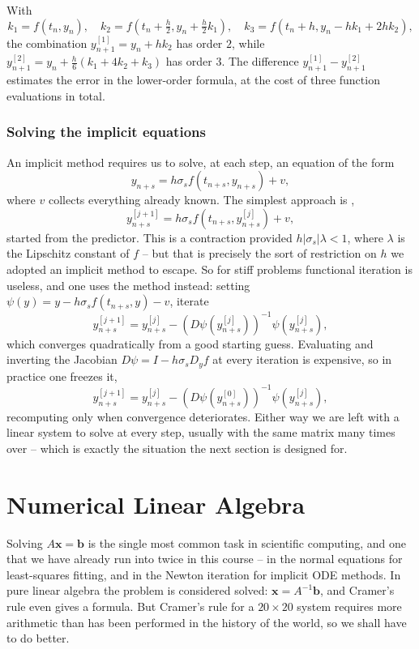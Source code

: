 \documentclass[a4paper]{scrartcl}
\providecommand{\abs}[1]{\left\lvert#1\right\rvert}
\renewcommand{\abs}[1]{\left\lvert#1\right\rvert}
\begin{document}
\begin{example}
  With
  $$
  k_1 = f(t_n,y_n), \quad k_2 = f\left(t_n + \tfrac{h}{2}, y_n + \tfrac{h}{2}k_1\right), \quad k_3 = f\left(t_n + h, y_n - hk_1 + 2hk_2\right),
  $$
  the combination $y^{[1]}_{n+1} = y_n + hk_2$ has order $2$, while $y^{[2]}_{n+1} = y_n + \tfrac{h}{6}(k_1 + 4k_2 + k_3)$ has order $3$. The difference $y^{[1]}_{n+1} - y^{[2]}_{n+1}$ estimates the error in the lower-order formula, at the cost of three function evaluations in total.
\end{example}

\subsubsection*{Solving the implicit equations}

An implicit method requires us to solve, at each step, an equation of the form
$$
y_{n+s} = h\sigma_s f(t_{n+s}, y_{n+s}) + v,
$$
where $v$ collects everything already known. The simplest approach is ,
$$
y^{[j+1]}_{n+s} = h\sigma_s f\left(t_{n+s}, y^{[j]}_{n+s}\right) + v,
$$
started from the predictor. This is a contraction provided $h\abs{\sigma_s}\lambda < 1$, where $\lambda$ is the Lipschitz constant of $f$ -- but that is precisely the sort of restriction on $h$ we adopted an implicit method to escape. So for stiff problems functional iteration is useless, and one uses the  method instead: setting $\psi(y) = y - h\sigma_s f(t_{n+s},y) - v$, iterate
$$
y^{[j+1]}_{n+s} = y^{[j]}_{n+s} - \left(D\psi\left(y^{[j]}_{n+s}\right)\right)^{-1}\psi\left(y^{[j]}_{n+s}\right),
$$
which converges quadratically from a good starting guess. Evaluating and inverting the Jacobian $D\psi = I - h\sigma_s D_yf$ at every iteration is expensive, so in practice one freezes it,
$$
y^{[j+1]}_{n+s} = y^{[j]}_{n+s} - \left(D\psi\left(y^{[0]}_{n+s}\right)\right)^{-1}\psi\left(y^{[j]}_{n+s}\right),
$$
recomputing only when convergence deteriorates. Either way we are left with a linear system to solve at every step, usually with the same matrix many times over -- which is exactly the situation the next section is designed for.


\section{Numerical Linear Algebra}

Solving $A\mathbf{x} = \mathbf{b}$ is the single most common task in scientific computing, and one that we have already run into twice in this course -- in the normal equations for least-squares fitting, and in the Newton iteration for implicit ODE methods. In pure linear algebra the problem is considered solved: $\mathbf{x} = A^{-1}\mathbf{b}$, and Cramer's rule even gives a formula. But Cramer's rule for a $20\times 20$ system requires more arithmetic than has been performed in the history of the world, so we shall have to do better.
\end{document}
